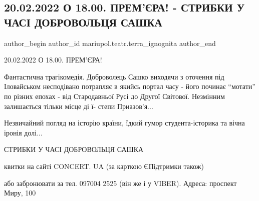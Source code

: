  
 
 
 
 

\subsection{20.02.2022 О 18.00. ПРЕМ'ЄРА! - СТРИБКИ У ЧАСІ ДОБРОВОЛЬЦЯ САШКА}
\label{sec:17_02_2022.fb.mariupol.teatr.terra_ignognita.1.20_02_2022_o_18_00__}

\ifcmt
 author_begin
   author_id mariupol.teatr.terra_ignognita
 author_end
\fi

20.02.2022 О 18.00. ПРЕМ'ЄРА!

Фантастична трагікомедія. Доброволець Сашко виходячи з оточення під Іловайськом
несподівано потрапляє в якийсь портал часу - його починає \enquote{мотати} по різних
епохах - від Стародавньої Русі до Другої Світової. Незмінним залишається тільки
місце ді ї- степи Приазов'я...

Незвичайний погляд на історію країни, їдкий гумор студента-історика та вічна
іронія долі...

СТРИБКИ У ЧАСІ ДОБРОВОЛЬЦЯ САШКА

квитки на сайті CONCERT. UA (за карткою ЄПідтримки також)

або забронювати за тел. 097004 2525 (він же і у VIBER). Адреса: проспект Миру, 100
